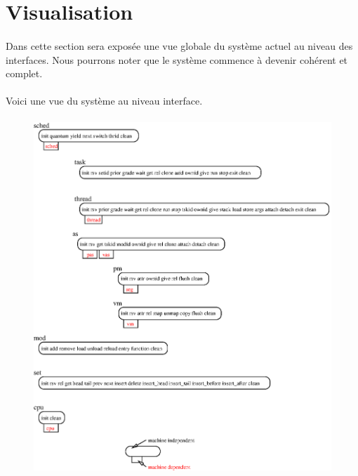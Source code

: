 \documentclass[10pt,a4wide]{article}
\begin{document}
\newpage

\section{Visualisation}

\paragraph{}

Dans cette section sera expos\'ee une vue globale du syst\`eme actuel
au niveau des interfaces. Nous pourrons noter que le syst\`eme commence
\`a devenir coh\'erent et complet.

\paragraph{}

Voici une vue du syst\`eme au niveau interface.

\paragraph{}

\begin{figure}[h]
\centerline{\includegraphics{figures/interfaces.eps}}
\end{figure}
\end{document}
